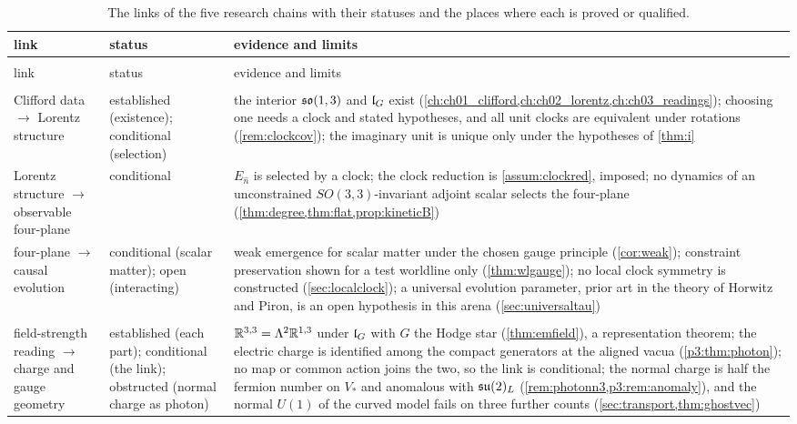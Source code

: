 {\footnotesize
\begin{longtable}{@{}>{\raggedright\arraybackslash}p{3.3cm}>{\raggedright\arraybackslash}p{2.5cm}>{\raggedright\arraybackslash}p{8.9cm}@{}}
\caption{The links of the five research chains with their statuses and the places where each is proved or qualified.}\label{tab:chains}\\
\toprule
link & status & evidence and limits\\
\midrule
\endfirsthead
\multicolumn{3}{@{}l}{\emph{\cref{tab:chains}, continued}}\\
\toprule
link & status & evidence and limits\\
\midrule
\endhead
\bottomrule
\endlastfoot
\multicolumn{3}{@{}l}{\emph{Spacetime}}\\
Clifford data $\to$ Lorentz structure & established (existence); conditional (selection) & the interior $\mathfrak{so}(1,3)$ and $\mathfrak l_G$ exist (\cref{ch:ch01_clifford,ch:ch02_lorentz,ch:ch03_readings}); choosing one needs a clock and stated hypotheses, and all unit clocks are equivalent under rotations (\cref{rem:clockcov}); the imaginary unit is unique only under the hypotheses of \cref{thm:i}\\
Lorentz structure $\to$ observable four-plane & conditional & $E_{\hat n}$ is selected by a clock; the clock reduction is \cref{assum:clockred}, imposed; no dynamics of an unconstrained $SO(3,3)$-invariant adjoint scalar selects the four-plane (\cref{thm:degree,thm:flat,prop:kineticB})\\
four-plane $\to$ causal evolution & conditional (scalar matter); open (interacting) & weak emergence for scalar matter under the chosen gauge principle (\cref{cor:weak}); constraint preservation shown for a test worldline only (\cref{thm:wlgauge}); no local clock symmetry is constructed (\cref{sec:localclock}); a universal evolution parameter, prior art in the theory of Horwitz and Piron, is an open hypothesis in this arena (\cref{sec:universaltau})\\
\addlinespace
\multicolumn{3}{@{}l}{\emph{Electromagnetism}}\\
field-strength reading $\to$ charge and gauge geometry & established (each part); conditional (the link); obstructed (normal charge as photon) & $\mathbb{R}^{3,3}=\Lambda^2\mathbb{R}^{1,3}$ under $\mathfrak l_G$ with $G$ the Hodge star (\cref{thm:emfield}), a representation theorem; the electric charge is identified among the compact generators at the aligned vacua (\cref{p3:thm:photon}); no map or common action joins the two, so the link is conditional; the normal charge is half the fermion number on $V_*$ and anomalous with $\mathfrak{su}(2)_L$ (\cref{rem:photonn3,p3:rem:anomaly}), and the normal $U(1)$ of the curved model fails on three further counts (\cref{sec:transport,thm:ghostvec})\\

\end{longtable}}
